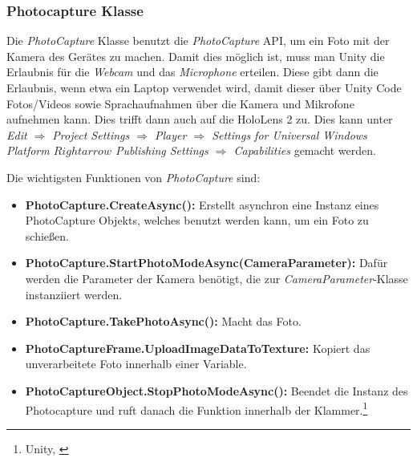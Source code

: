 \subsubsection{\label{sec:Photocapture}Photocapture Klasse}
Die \textit{PhotoCapture} Klasse benutzt die \textit{PhotoCapture} API, um ein Foto mit der Kamera des Gerätes zu machen.
Damit dies möglich ist, muss man Unity die Erlaubnis für die \textit{Webcam} und das \textit{Microphone} erteilen. Diese gibt dann die Erlaubnis, wenn etwa ein Laptop verwendet wird, damit dieser über Unity Code Fotos/Videos sowie Sprachaufnahmen über die Kamera und Mikrofone aufnehmen kann. Dies trifft dann auch auf die HoloLens 2 zu.
Dies kann unter \textit{Edit $\Rightarrow$ Project Settings $\Rightarrow$ Player $\Rightarrow$ Settings for Universal Windows Platform $Rightarrow$ Publishing Settings $\Rightarrow$ Capabilities} gemacht werden.

Die wichtigsten Funktionen von \textit{PhotoCapture} sind:


\begin{itemize}
    \item \textbf{PhotoCapture.CreateAsync():} Erstellt asynchron eine Instanz eines PhotoCapture Objekts, welches benutzt werden kann, um ein Foto zu schießen.
    \item \textbf{PhotoCapture.StartPhotoModeAsync(CameraParameter):} Dafür werden die Parameter der Kamera benötigt, die zur \textit{CameraParameter}-Klasse instanziiert werden.
    \item \textbf{PhotoCapture.TakePhotoAsync():} Macht das Foto.
    \item \textbf{PhotoCaptureFrame.UploadImageDataToTexture:} Kopiert das unverarbeitete Foto innerhalb einer Variable.
    \item \textbf{PhotoCaptureObject.StopPhotoModeAsync():} Beendet die Instanz des Photocapture und ruft danach die Funktion innerhalb der Klammer.\footnote{Unity, \cite{Photocapture}}
\end{itemize}


